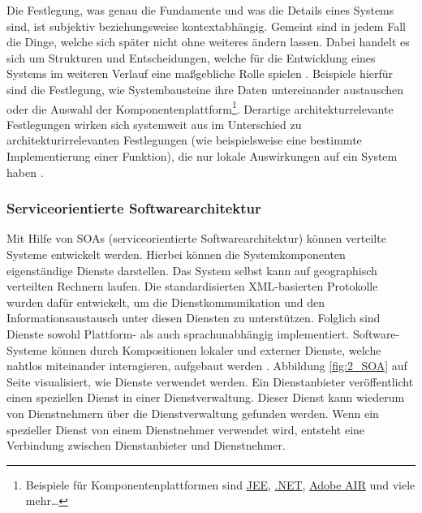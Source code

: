 Die Festlegung, was genau die Fundamente und was die Details eines Systems sind, ist subjektiv beziehungsweise kontextabhängig. Gemeint sind in jedem Fall die Dinge, welche sich später nicht ohne weiteres ändern lassen. Dabei handelt es sich um Strukturen und Entscheidungen, welche für die Entwicklung eines Systems im weiteren Verlauf eine maßgebliche Rolle spielen \citereset \autocite[siehe][]{Fowler.2005}. Beispiele hierfür sind die Festlegung, wie Systembausteine ihre Daten untereinander austauschen oder die Auswahl der Komponentenplattform\footnote{Beispiele für Komponentenplattformen sind \href{http://www.oracle.com/technetwork/java/javaee}{JEE}, \href{http://www.microsoft.com/net}{.NET}, \href{http://www.adobe.com/at/products/air.html}{Adobe AIR} und viele mehr\ldots }. Derartige architekturrelevante Festlegungen wirken sich systemweit aus im Unterschied zu architekturirrelevanten Festlegungen (wie beispielsweise eine bestimmte Implementierung einer Funktion), die nur lokale Auswirkungen auf ein System haben \citereset \autocite[siehe][]{Bredemeyer.Malan.2004}.

\subsubsection{Serviceorientierte Softwarearchitektur}
\label{sec:2_Serviceorientierte_Softwarearchitektur}
Mit Hilfe von SOAs (serviceorientierte Softwarearchitektur) können verteilte Systeme entwickelt werden. Hierbei können die Systemkomponenten eigenständige Dienste darstellen. Das System selbst kann auf geographisch verteilten Rechnern laufen. Die standardisierten XML-basierten Protokolle wurden dafür entwickelt, um die Dienstkommunikation und den Informationsaustausch unter diesen Diensten zu unterstützen. Folglich sind Dienste sowohl Plattform- als auch sprachunabhängig implementiert. Software-Systeme können durch Kompositionen lokaler und externer Dienste, welche nahtlos miteinander interagieren, aufgebaut werden \citereset \autocite[siehe][S. 509-514]{Sommerville.2011}. Abbildung \ref{fig:2_SOA} auf Seite \pageref{fig:2_SOA} visualisiert, wie Dienste verwendet werden. Ein Dienstanbieter veröffentlicht einen speziellen Dienst in einer Dienstverwaltung. Dieser Dienst kann wiederum von Dienstnehmern über die Dienstverwaltung gefunden werden. Wenn ein spezieller Dienst von einem Dienstnehmer verwendet wird, entsteht eine Verbindung zwischen Dienstanbieter und Dienstnehmer.

